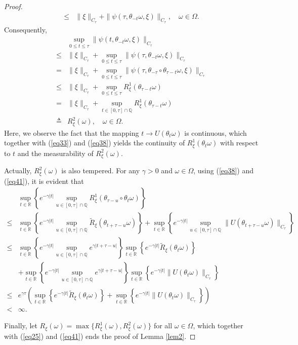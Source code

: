 \documentclass[preprint,12pt]{elsarticle}
\begin{document}
\begin{proof}
\begin{align}
\leq&\|\xi\|_{C_\tau}+\|\psi(\tau,\theta_{-t}\omega,\xi)\|_{C_\tau},\quad\omega\in\Omega.
\end{align}
Consequently,
\begin{align}\label{eq41}
&\sup_{0\leq t\leq\tau}\|\psi(t,\theta_{-t}\omega,\xi)\|_{C_\tau}\nonumber\\
\leq&\|\xi\|_{C_\tau}+\sup_{0\leq t\leq\tau}\|\psi(\tau,\theta_{-t}\omega,\xi)\|_{C_\tau}\nonumber\\
=&\|\xi\|_{C_\tau}+\sup_{0\leq t\leq\tau}\|\psi(\tau,\theta_{-\tau}\circ\theta_{\tau-t}\omega,\xi)\|_{C_\tau}\nonumber\\
\leq&\|\xi\|_{C_\tau}+\sup_{0\leq t\leq\tau}R_\xi^1(\theta_{\tau-t}\omega)\nonumber\\
=&\|\xi\|_{C_\tau}+\sup_{t\in[0,\tau]\cap\mathbb{Q}}R_\xi^1(\theta_{\tau-t}\omega)\nonumber\\
\triangleq&R_\xi^2(\omega),\quad\omega\in\Omega.
\end{align}
Here, we observe the fact that the mapping $t\rightarrow U(\theta_t\omega)$ is continuous, which together with (\ref{eq33}) and (\ref{eq38}) yields the continuity of $R_\xi^1(\theta_t\omega)$ with respect to $t$ and the measurability of $R_\xi^2(\omega)$.

Actually, $R_\xi^2(\omega)$ is also tempered. For any $\gamma>0$ and $\omega\in\Omega$, using (\ref{eq38}) and (\ref{eq41}), it is evident that
\begin{align}\label{eq42}
&\sup_{t\in\mathbb{R}}\left\{e^{-\gamma|t|}\sup_{u\in[0,\tau]\cap\mathbb{Q}}R_\xi^1(\theta_{\tau-u}\circ\theta_t\omega)\right\}\nonumber\\
\leq&\sup_{t\in\mathbb{R}}\left\{e^{-\gamma|t|}\sup_{u\in[0,\tau]\cap\mathbb{Q}}\widetilde{R}_\xi(\theta_{t+\tau-u}\omega)\right\}
+\sup_{t\in\mathbb{R}}\left\{e^{-\gamma|t|}\sup_{u\in[0,\tau]\cap\mathbb{Q}}\|U(\theta_{t+\tau-u}\omega)\|_{C_\tau}\right\}\nonumber\\
\leq&\sup_{t\in\mathbb{R}}\left\{e^{-\gamma|t|}\sup_{u\in[0,\tau]\cap\mathbb{Q}}e^{\gamma|t+\tau-u|}\right\}
\sup_{t\in\mathbb{R}}\left\{e^{-\gamma|t|}\widetilde{R}_\xi(\theta_{t}\omega)\right\}\nonumber\\
&+\sup_{t\in\mathbb{R}}\left\{e^{-\gamma|t|}\sup_{u\in[0,\tau]\cap\mathbb{Q}}e^{\gamma|t+\tau-u|}\right\}
\sup_{t\in\mathbb{R}}\left\{e^{-\gamma|t|}\|U(\theta_{t}\omega)\|_{C_\tau}\right\}\nonumber\\
\leq&e^{\gamma\tau}\left(\sup_{t\in\mathbb{R}}\left\{e^{-\gamma|t|}\widetilde{R}_\xi(\theta_{t}\omega)\right\}
+\sup_{t\in\mathbb{R}}\left\{e^{-\gamma|t|}\|U(\theta_{t}\omega)\|_{C_\tau}\right\}\right)\nonumber\\
<&\infty.
\end{align}

Finally, let $R_\xi(\omega)=\max\{R_\xi^1(\omega),R_\xi^2(\omega)\}$ for all $\omega\in\Omega$, which together with (\ref{eq25}) and (\ref{eq41}) ends the proof of Lemma \ref{lem2}.
\end{proof}
\end{document}
